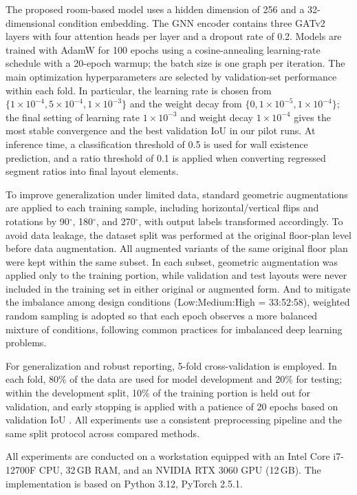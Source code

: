 The proposed room-based model uses a hidden dimension of 256 and a 32-dimensional condition embedding. The GNN encoder contains three GATv2 layers with four attention heads per layer and a dropout rate of 0.2. Models are trained with AdamW for 100 epochs using a cosine-annealing learning-rate schedule with a 20-epoch warmup; the batch size is one graph per iteration. The main optimization hyperparameters are selected by validation-set performance within each fold. In particular, the learning rate is chosen from $\{1\times10^{-4}, 5\times10^{-4}, 1\times10^{-3}\}$ and the weight decay from $\{0, 1\times10^{-5}, 1\times10^{-4}\}$; the final setting of learning rate $1\times10^{-3}$ and weight decay $1\times10^{-4}$ gives the most stable convergence and the best validation IoU in our pilot runs. At inference time, a classification threshold of 0.5 is used for wall existence prediction, and a ratio threshold of 0.1 is applied when converting regressed segment ratios into final layout elements.

To improve generalization under limited data, standard geometric augmentations are applied to each training sample, including horizontal/vertical flips and rotations by 90$^{\circ}$, 180$^{\circ}$, and 270$^{\circ}$, with output labels transformed accordingly. To avoid data leakage, the dataset split was performed at the original floor-plan level before data augmentation. All augmented variants of the same original floor plan were kept within the same subset. In each subset, geometric augmentation was applied only to the training portion, while validation and test layouts were never included in the training set in either original or augmented form. And to mitigate the imbalance among design conditions (Low:Medium:High = 33:52:58), weighted random sampling is adopted so that each epoch observes a more balanced mixture of conditions, following common practices for imbalanced deep learning problems.

For generalization and robust reporting, 5-fold cross-validation is employed. In each fold, 80\% of the data are used for model development and 20\% for testing; within the development split, 10\% of the training portion is held out for validation, and early stopping is applied with a patience of 20 epochs based on validation IoU \cite{Berrar_2019}. All experiments use a consistent preprocessing pipeline and the same split protocol across compared methods.

All experiments are conducted on a workstation equipped with an Intel Core i7-12700F CPU, 32\,GB RAM, and an NVIDIA RTX 3060 GPU (12\,GB). The implementation is based on Python 3.12, PyTorch 2.5.1.


